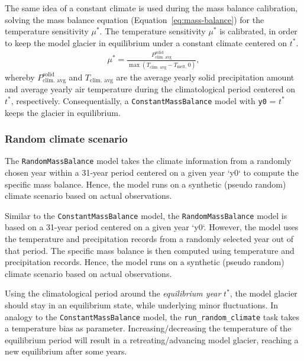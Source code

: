            The same idea of a constant climate is used during the mass balance calibration, solving the mass balance equation (Equation~\ref{eq:mass-balance}) for the temperature sensitivity $\mu^*$. The temperature sensitivity $\mu^*$ is calibrated, in order to keep the model glacier in equilibrium under a constant climate centered on $t^*$.
            \begin{align}\label{eq:mb-calibration}
                \mu^* = \frac{P_{\text{clim. avg}}^{\text{solid}}}
                        {\max(T_{\text{clim. avg}}^{\text{}} - T_{\text{melt},}\ 0)},            
            \end{align}
            whereby $P_{\text{clim. avg}}^{\text{solid}}$ and $T_{\text{clim. avg}}^{\text{}}$ are the average yearly solid precipitation amount and average yearly air temperature during the climatological period centered on $t^*$, respectively. Consequentially, a \lstinline`ConstantMassBalance` model with \lstinline`y0` = $t^*$ keeps the glacier in equilibrium.
            
        

        \subsubsection{Random climate scenario} %
        \label{ssub:random_climate_scenario}

            The \lstinline`RandomMassBalance` model takes the climate information from a randomly chosen year within a 31-year period centered on a given year `y0` to compute the specific mass balance. Hence, the model runs on a synthetic (pseudo random) climate scenario based on actual observations.

            Similar to the \lstinline`ConstantMassBalance` model, the \lstinline`RandomMassBalance` model is based on a 31-year period centered on a given year `y0`. However, the model uses the temperature and precipitation records from a randomly selected year out of that period. The specific mass balance is then computed using temperature and precipitation records. Hence, the model runs on a synthetic (pseudo random) climate scenario based on actual observations.

            Using the climatological period around the \textit{equilibrium year} $t^*$, the model glacier should stay in an equilibrium state, while underlying minor fluctuations. In analogy to the \lstinline`ConstantMassBalance` model, the \lstinline`run_random_climate` task takes a temperature bias as parameter. Increasing/decreasing the temperature of the equilibrium period will result in a retreating/advancing model glacier, reaching a new equilibrium after some years.
        
